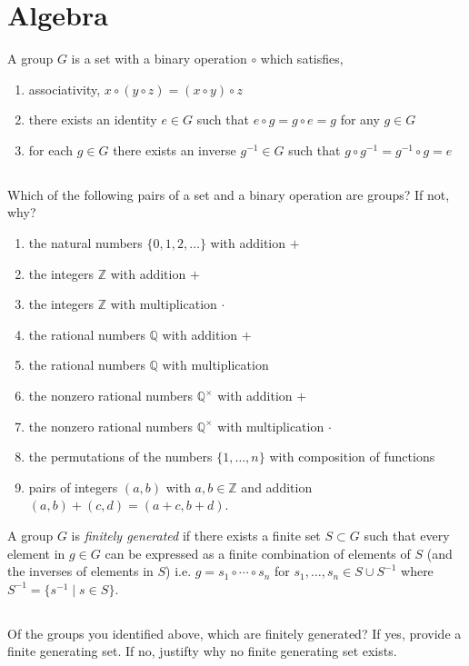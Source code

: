 \documentclass{article}
\newcommand{\Z}{\mathbb{Z}}
\newcommand{\Q}{\mathbb{Q}}
\theoremstyle{definition}
\newenvironment{definition}[1][Definition:]{\begin{trivlist}
\item[\hskip \labelsep {\bfseries #1}]}{\end{trivlist}}
\begin{document}
\section{Algebra}


\begin{definition}
A group $G$ is a set with a binary operation $\circ$ which satisfies,
\begin{enumerate}
\item associativity, $x \circ (y \circ z) = (x \circ y) \circ z$
\item there exists an identity $e \in G$ such that $e \circ g = g \circ e = g$ for any $g \in G$
\item for each $g \in G$ there exists an inverse $g^{-1} \in G$ such that $g \circ g^{-1} = g^{-1} \circ g = e$
\end{enumerate} 
\end{definition}

\subsection{}

Which of the following pairs of a set and a binary operation are groups? If not, why?

\begin{enumerate}
\item[(a.)] the natural numbers $\{0, 1, 2, \dots \}$ with addition $+$
\item[(b.)] the integers $\Z$ with addition $+$
\item[(c.)] the integers $\Z$ with multiplication $\cdot$
\item[(d.)] the rational numbers $\Q$ with addition $+$
\item[(e.)] the rational numbers $\Q$ with multiplication
\item[(f.)] the nonzero rational numbers $\Q^\times$ with addition $+$
\item[(g.)] the nonzero rational numbers $\Q^\times$ with multiplication $\cdot$
\item[(h.)] the permutations of the numbers $\{1, \dots, n\}$ with composition of functions
\item[(i.)] pairs of integers $(a,b)$ with $a,b \in \Z$ and addition $(a,b) + (c,d) = (a+c, b+d)$.
\end{enumerate}

\begin{definition}
A group $G$ is \textit{finitely generated} if there exists a finite set $S \subset G$ such that every element in $g \in G$ can be expressed as a finite combination of elements of $S$ (and the inverses of elements in $S$) i.e. $g = s_1 \circ \cdots \circ s_n$ for $s_1, \dots, s_n \in S \cup S^{-1}$ where $S^{-1} = \{ s^{-1} \mid s \in S \}$.
\end{definition}

\subsection{}

Of the groups you identified above, which are finitely generated? If yes, provide a finite generating set. If no, justifty why no finite generating set exists.
\end{document}
